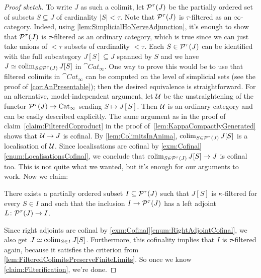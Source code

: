 \begin{proof}[Proof sketch]
	To write $J$ as such a colimit, let $\mathcal{P}^\tau(J)$ be the partially ordered set of subsets $S\subseteq J$ of cardinality $\left|S\right|<\tau$. Note that $\mathcal{P}^\tau(J)$ is $\tau$-filtered as an $\infty$-category. Indeed, using \cref{lem:SimplicialHoNerveAdjunction}, it's enough to show that $\mathcal{P}^\tau(J)$ is $\tau$-filtered as an ordinary category, which is true since we can just take unions of $<\tau$ subsets of cardinality $<\tau$. Each $S\in\mathcal{P}^\tau(J)$ can be identified with the full subcategory $J[S]\subseteq J$ spanned by $S$ and we have $J\simeq \operatorname*{colim}_{S\in\mathcal{P}^\tau(J)}J[S]$ in $\cat{Cat}_\infty$. One way to prove this would be to use that filtered colimits in $\cat{Cat}_\infty$ can be computed on the level of simplicial sets (see the proof of \cref{cor:AnPresentable}); then the desired equivalence is straightforward. For an alternative, model-independent argument, let $\mathcal{U}$ be the unstraightening of the functor $\mathcal{P}^\tau(J)\rightarrow \mathrm{Cat}_\infty$ sending $S\mapsto J[S]$. Then $\mathcal{U}$ is an ordinary category and can be easily described explicitly. The same argument as in the proof of claim~\cref{claim:FilteredCoproduct} in the proof of~\cref{lem:KappaCompactlyGenerated} shows that $\mathcal{U}\rightarrow J$ is cofinal. By \cref{lem:ColimitsInAnima}, $\operatorname*{colim}_{S\in\mathcal{P}^\tau(J)}J[S]$ is a localisation of $\mathcal{U}$. Since localisations are cofinal by  \cref{exm:Cofinal}\cref{enum:LocalisationsCofinal}, we conclude that $\operatorname*{colim}_{S\in\mathcal{P}^\tau(J)}J[S]\rightarrow J$ is cofinal too. This is not quite what we wanted, but it's enough for our arguments to work. Now we claim:
	\begin{alphanumerate}\itshape
		\item[\boxtimes] \!There exists a partially ordered subset $I\subseteq \mathcal{P}^\tau(J)$ such that $J[S]$ is $\kappa$-filtered for every $S\in I$ and such that the inclusion $I\rightarrow\mathcal{P}^\tau(J)$ has a left adjoint $L\colon \mathcal{P}^\tau(J)\rightarrow I$.\label{claim:Filterification}
	\end{alphanumerate}
	Since right adjoints are cofinal by \cref{exm:Cofinal}\cref{enum:RightAdjointCofinal}, we also get $J\simeq \operatorname*{colim}_{S\in I}J[S]$. Furthermore, this cofinality implies that $I$ is $\tau$-filtered again, because it satisfies the criterion from \cref{lem:FilteredColimitsPreserveFiniteLimits}. So once we know \cref{claim:Filterification}, we're done.
	

\end{proof}
